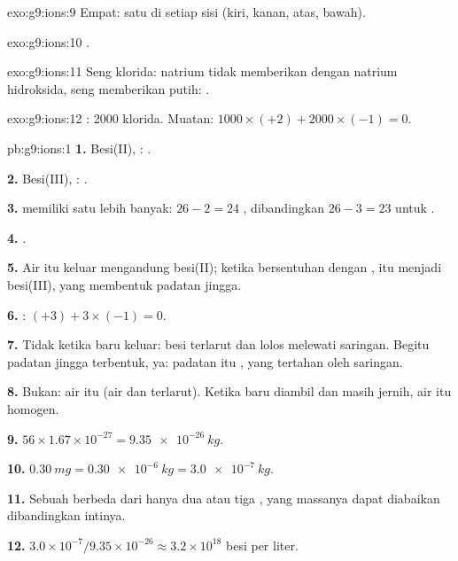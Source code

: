 \begin{solution}{exo:g9:ions:9}
Empat: satu di setiap sisi (kiri, kanan, atas, bawah).
\end{solution}

\begin{solution}{exo:g9:ions:10}
.
\end{solution}

\begin{solution}{exo:g9:ions:11}
Seng klorida:  natrium tidak memberikan  dengan natrium
hidroksida,  seng memberikan  putih:
.
\end{solution}

\begin{solution}{exo:g9:ions:12}
: 2000  klorida. Muatan: $1000 \times (+2) + 2000 \times
(-1) = 0$.
\end{solution}

\begin{solution}{pb:g9:ions:1}
\textbf{1.} Besi(II), : .

\textbf{2.} Besi(III), : .

\textbf{3.}  memiliki satu lebih banyak: $26 - 2 = 24$
, dibandingkan $26 - 3 = 23$ untuk .

\textbf{4.} .

\textbf{5.} Air itu keluar mengandung  besi(II); ketika bersentuhan
dengan ,  itu menjadi  besi(III), yang membentuk padatan
jingga.

\textbf{6.} : $(+3) + 3 \times (-1) = 0$.

\textbf{7.} Tidak ketika baru keluar:  besi terlarut dan lolos
melewati saringan. Begitu padatan jingga terbentuk, ya: padatan itu
, yang tertahan oleh saringan.

\textbf{8.} Bukan: air itu  (air dan  terlarut). Ketika
baru diambil dan masih jernih, air itu homogen.

\textbf{9.} $56 \times 1.67 \times 10^{-27} = \qty{9.35e-26}{kg}$.

\textbf{10.} $\qty{0.30}{mg} = \qty{0.30e-6}{kg} = \qty{3.0e-7}{kg}$.

\textbf{11.} Sebuah  berbeda dari  hanya dua atau tiga
, yang massanya dapat diabaikan dibandingkan intinya.

\textbf{12.} $3.0 \times 10^{-7} / 9.35 \times 10^{-26} \approx 3.2
\times 10^{18}$  besi per liter.
\end{solution}
